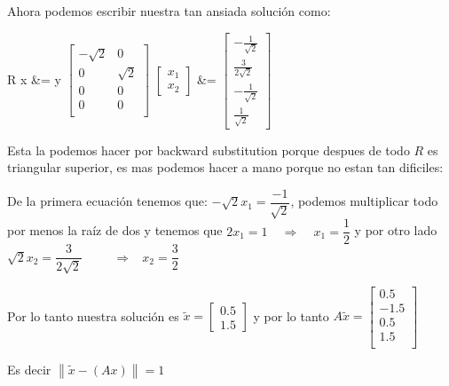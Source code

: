 \documentclass[12pt, fleqn]{report}                             %
\def \Eq {equation}                                             %
\newenvironment{MultiLineEquation*}[1]                          %
        {\begin{\Eq*}\begin{alignedat}{#1}}                         %
        {\end{alignedat}\end{\Eq*}}                                 %
\DeclareMathOperator \Space     {\quad}                         %
\DeclareMathOperator \MiniSpace {\;}                            %
\theoremstyle{break}                                            %
\newcommand \lInfire {\MiniSpace \Rightarrow \MiniSpace}        %
\newcommand{\Abs}[1]    {\left\lVert #1 \right\lVert}           %
\newcommand{\bVector}[1]                                        %
        { \ensuremath{\begin{bmatrix}#1\end{bmatrix}} }             %
\begin{document}
            Ahora podemos escribir nuestra tan ansiada solución como:
            \begin{MultiLineEquation*}{3}
                R \vec x &= \vec y
                \bVector{
                        -\sqrt{2} & 0   \\
                        0 & \sqrt{2}  \\
                        0 & 0   \\
                        0 & 0   \\ 
                    }
                \bVector{
                    x_1 \\ x_2
                }
                &= 
                \bVector{
                    -\frac{1}{\sqrt{2}}     \\
                    \frac{3}{2\sqrt{2}}     \\
                    -\frac{1}{\sqrt{2}}     \\
                    \frac{1}{\sqrt{2}}
                }
            \end{MultiLineEquation*}

            Esta la podemos hacer por backward substitution porque despues de todo $R$ es triangular superior,
            es mas podemos hacer a mano porque no estan tan dificiles:

            De la primera ecuación tenemos que:
            $-\sqrt{2} x_1 = \dfrac{-1}{\sqrt{2}}$, podemos multiplicar todo por menos la raíz de dos y tenemos
            que $2x_1 = 1 \;\lInfire\; x_1 = \dfrac{1}{2}$ 
            y por otro lado $\sqrt{2}x_2 = \dfrac{3}{2\sqrt{2}} \Space \lInfire x_2 = \dfrac{3}{2}$
            

            Por lo tanto nuestra solución es $\tilde x = \bVector{0.5 \\1.5}$
            y por lo tanto $A \tilde x = \bVector{
                0.5 \\
                -1.5 \\
                0.5 \\
                1.5 \\
                }$

            Es decir $\Abs{\tilde x - (Ax)} = 1$



\end{document}
